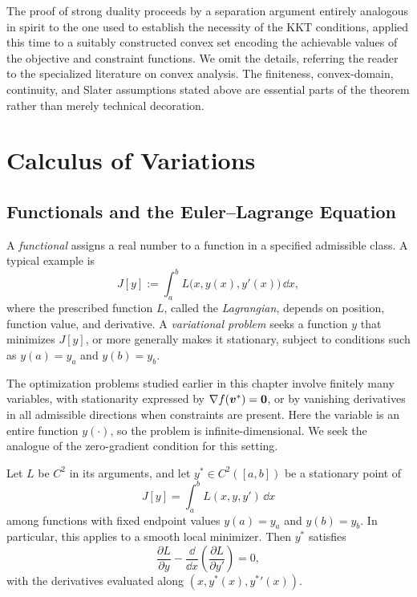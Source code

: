 The proof of strong duality proceeds by a separation argument entirely analogous in spirit to the one used to establish the necessity of the KKT conditions, applied this time to a suitably constructed convex set encoding the achievable values of the objective and constraint functions. We omit the details, referring the reader to the specialized literature on convex analysis. The finiteness, convex-domain, continuity, and Slater assumptions stated above are essential parts of the theorem rather than merely technical decoration.

\section{Calculus of Variations}
\label{sec:calculus-variations}

\subsection{Functionals and the Euler--Lagrange Equation}

\begin{definition}[Functional]
A \emph{functional} assigns a real number to a function in a specified admissible class. A typical example is \[
J[y]:=\int_a^b L\big(x,y(x),y'(x)\big)\,\dd x,
\] where the prescribed function $L$, called the \emph{Lagrangian}, depends on position, function value, and derivative. A \emph{variational problem} seeks a function $y$ that minimizes $J[y]$, or more generally makes it stationary, subject to conditions such as $y(a)=y_a$ and $y(b)=y_b$.
\end{definition}

The optimization problems studied earlier in this chapter involve finitely many variables, with stationarity expressed by $\nabla f(\bm{v}^*)=\mathbf{0}$, or by vanishing derivatives in all admissible directions when constraints are present. Here the variable is an entire function $y(\cdot)$, so the problem is infinite-dimensional. We seek the analogue of the zero-gradient condition for this setting.


\begin{theorem}
\label{thm:euler-lagrange}
Let $L$ be $C^2$ in its arguments, and let $y^*\in C^2([a,b])$ be a stationary point of \[
J[y]=\int_a^b L(x,y,y')\,\dd x
\] among functions with fixed endpoint values $y(a)=y_a$ and $y(b)=y_b$. In particular, this applies to a smooth local minimizer. Then $y^*$ satisfies
\[
\frac{\partial L}{\partial y} -\frac{\dd}{\dd x}\left(\frac{\partial L}{\partial y'}\right)=0,
\] with the derivatives evaluated along $(x,y^*(x),{y^*}'(x))$.
\end{theorem}

